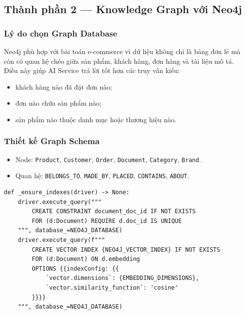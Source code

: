 \documentclass[12pt,a4paper]{article}
\begin{document}
\subsection{Thành phần 2 --- Knowledge Graph với Neo4j}
\subsubsection{Lý do chọn Graph Database}
Neo4j phù hợp với bài toán e-commerce vì dữ liệu không chỉ là bảng đơn lẻ mà còn có quan hệ chéo giữa sản phẩm, khách hàng, đơn hàng và tài liệu mô tả. Điều này giúp AI Service trả lời tốt hơn các truy vấn kiểu:
\begin{itemize}
  \item khách hàng nào đã đặt đơn nào;
  \item đơn nào chứa sản phẩm nào;
  \item sản phẩm nào thuộc danh mục hoặc thương hiệu nào.
\end{itemize}

\subsubsection{Thiết kế Graph Schema}
\begin{itemize}
  \item Node: \texttt{Product}, \texttt{Customer}, \texttt{Order}, \texttt{Document}, \texttt{Category}, \texttt{Brand}.
  \item Quan hệ: \texttt{BELONGS\_TO}, \texttt{MADE\_BY}, \texttt{PLACED}, \texttt{CONTAINS}, \texttt{ABOUT}.
\end{itemize}

\begin{lstlisting}[style=code,caption={Tạo constraint và vector index trong Neo4j}]
def _ensure_indexes(driver) -> None:
    driver.execute_query("""
        CREATE CONSTRAINT document_doc_id IF NOT EXISTS
        FOR (d:Document) REQUIRE d.doc_id IS UNIQUE
    """, database_=NEO4J_DATABASE)
    driver.execute_query(f"""
        CREATE VECTOR INDEX {NEO4J_VECTOR_INDEX} IF NOT EXISTS
        FOR (d:Document) ON d.embedding
        OPTIONS {{indexConfig: {{
            `vector.dimensions`: {EMBEDDING_DIMENSIONS},
            `vector.similarity_function`: 'cosine'
        }}}}
    """, database_=NEO4J_DATABASE)
\end{lstlisting}
\end{document}
